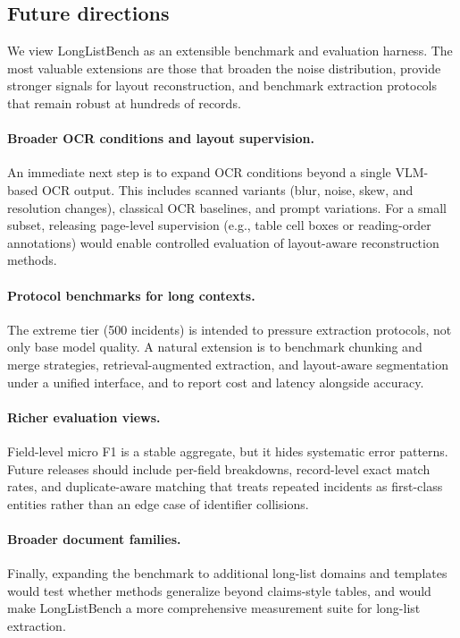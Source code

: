 \subsection{Future directions}
We view LongListBench as an extensible benchmark and evaluation harness. The most valuable extensions are those that broaden the noise distribution, provide stronger signals for layout reconstruction, and benchmark extraction protocols that remain robust at hundreds of records.

\paragraph{Broader OCR conditions and layout supervision.}
An immediate next step is to expand OCR conditions beyond a single VLM-based OCR output. This includes scanned variants (blur, noise, skew, and resolution changes), classical OCR baselines, and prompt variations. For a small subset, releasing page-level supervision (e.g., table cell boxes or reading-order annotations) would enable controlled evaluation of layout-aware reconstruction methods.

\paragraph{Protocol benchmarks for long contexts.}
The extreme tier (500 incidents) is intended to pressure extraction protocols, not only base model quality. A natural extension is to benchmark chunking and merge strategies, retrieval-augmented extraction, and layout-aware segmentation under a unified interface, and to report cost and latency alongside accuracy.

\paragraph{Richer evaluation views.}
Field-level micro F1 is a stable aggregate, but it hides systematic error patterns. Future releases should include per-field breakdowns, record-level exact match rates, and duplicate-aware matching that treats repeated incidents as first-class entities rather than an edge case of identifier collisions.

\paragraph{Broader document families.}
Finally, expanding the benchmark to additional long-list domains and templates would test whether methods generalize beyond claims-style tables, and would make LongListBench a more comprehensive measurement suite for long-list extraction.
